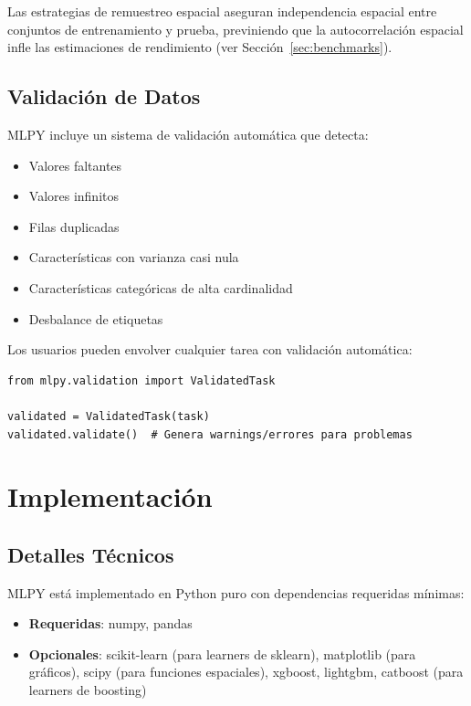 \documentclass[twoside,11pt]{article}
\begin{document}
Las estrategias de remuestreo espacial aseguran independencia espacial entre conjuntos de entrenamiento y prueba, previniendo que la autocorrelación espacial infle las estimaciones de rendimiento (ver Sección~\ref{sec:benchmarks}).

\subsection{Validación de Datos}

MLPY incluye un sistema de validación automática que detecta:
\begin{itemize}
  \item Valores faltantes
  \item Valores infinitos
  \item Filas duplicadas
  \item Características con varianza casi nula
  \item Características categóricas de alta cardinalidad
  \item Desbalance de etiquetas
\end{itemize}

Los usuarios pueden envolver cualquier tarea con validación automática:

\begin{lstlisting}
from mlpy.validation import ValidatedTask

validated = ValidatedTask(task)
validated.validate()  # Genera warnings/errores para problemas
\end{lstlisting}

\section{Implementación}
\label{sec:implementation}

\subsection{Detalles Técnicos}

MLPY está implementado en Python puro con dependencias requeridas mínimas:
\begin{itemize}
  \item \textbf{Requeridas}: numpy, pandas
  \item \textbf{Opcionales}: scikit-learn (para learners de sklearn), matplotlib (para gráficos),
        scipy (para funciones espaciales), xgboost, lightgbm, catboost (para learners de boosting)
\end{itemize}
\end{document}
